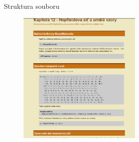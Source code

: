 \documentclass{beamer}
\begin{document}
\begin{frame}{Struktura souboru}
\begin{figure}
   \includegraphics[width=6cm]{ukc1.png}
\end{figure}
\end{frame}
\end{document}
